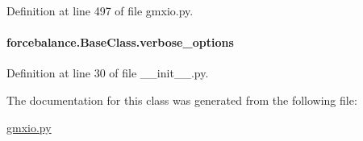 Definition at line 497 of file gmxio.\-py.

\hypertarget{classforcebalance_1_1BaseClass_afd68efa29ccd2f320f4cf82198214aac}{
\paragraph[{verbose\-\_\-options}]{\setlength{\rightskip}{0pt plus 5cm}forcebalance.\-Base\-Class.\-verbose\-\_\-options\hspace{0.3cm}{\ttfamily [inherited]}}}\label{classforcebalance_1_1BaseClass_afd68efa29ccd2f320f4cf82198214aac}


Definition at line 30 of file \-\_\-\-\_\-init\-\_\-\-\_\-.\-py.



The documentation for this class was generated from the following file\-:\begin{DoxyCompactItemize}
\item 
\hyperlink{gmxio_8py}{gmxio.\-py}\end{DoxyCompactItemize}
